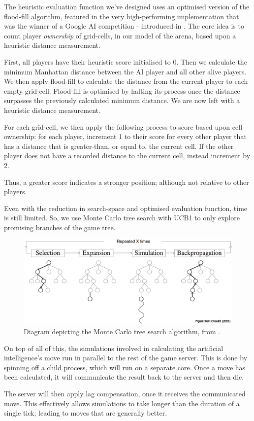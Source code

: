 \documentclass{standalone}
\begin{document}
		The heuristic evaluation function we've designed uses an optimised version of the flood-fill algorithm, featured in the very high-performing implementation that was the winner of a Google AI competition - introduced in . The core idea is to count player \emph{ownership} of grid-cells, in our model of the arena, based upon a heuristic distance measurement.

		First, all players have their heuristic score initialised to 0. Then we calculate the minimum Manhattan distance between the AI player and all other alive players. We then apply flood-fill to calculate the distance from the current player to each empty grid-cell. Flood-fill is optimised by halting its process once the distance surpasses the previously calculated minimum distance. We are now left with a heuristic distance measurement.

		For each grid-cell, we then apply the following process to score based upon cell ownership: for each player, increment 1 to their score for every other player that has a distance that is greater-than, or equal to, the current cell. If the other player does not have a recorded distance to the current cell, instead increment by 2.

		Thus, a greater score indicates a stronger position; although not relative to other players.

		Even with the reduction in search-space and optimised evaluation function, time is still limited. So, we use Monte Carlo tree search \parencite{MonteCarloTreeSearch} with UCB1 to only explore promising branches of the game tree. 
		\begin{figure}[!htbp]
			\centering
			\includegraphics[width=.8\textwidth]{resources/images/mcts.png}
			\caption{Diagram depicting the Monte Carlo tree search algorithm, from \parencite{MonteCarloTreeSearchDiagram}.}
		\end{figure}

		On top of all of this, the simulations involved in calculating the artificial intelligence's move run in parallel to the rest of the game server. This is done by spinning off a child process, which will run on a separate core. Once a move has been calculated, it will communicate the result back to the server and then die.

		The server will then apply lag compensation, once it receives the communicated move. This effectively allows simulations to take longer than the duration of a single tick; leading to moves that are generally better.
\end{document}
